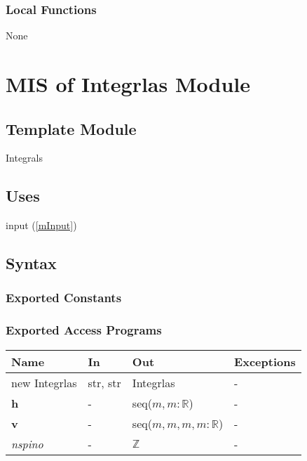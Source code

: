 \documentclass[12pt, titlepage]{article}
\begin{document}
\subsubsection{Local Functions}

None

\newpage

\section{MIS of Integrlas Module} \label{mIntegrals}

\subsection{Template Module}

Integrals

\subsection{Uses}
input (\ref{mInput})

\subsection{Syntax}

\subsubsection{Exported Constants}

\subsubsection{Exported Access Programs}

\begin{center}
	\begin{tabular}{p{2.7cm} p{4cm} p{4cm} p{2cm}}
		\hline
		\textbf{Name} & \textbf{In} & \textbf{Out} & \textbf{Exceptions} \\
		\hline
		new Integrlas& str, str& Integrlas& -\\
 		\textbf{h}& -& seq($m,m:\mathbb{R}$)& -\\
 		\textbf{v}& -& seq($m,m,m,m:\mathbb{R}$)& -\\
		\textit{nspino} & -& $\mathbb{Z}$& -\\
		\hline
	\end{tabular}
\end{center}
\end{document}
